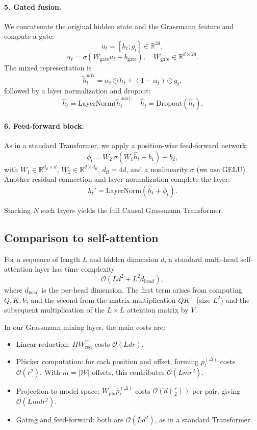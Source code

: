 \documentclass[11pt]{article}
\begin{document}
\paragraph{5. Gated fusion.}
We concatenate the original hidden state and the Grassmann feature and compute a gate:
\[
u_t = [h_t; g_t] \in \mathbb{R}^{2d},
\]
\[
\alpha_t = \sigma(W_{\text{gate}} u_t + b_{\text{gate}}),\quad W_{\text{gate}} \in \mathbb{R}^{d \times 2d}.
\]
The mixed representation is
\[
\tilde{h}_t^{\text{mix}} = \alpha_t \odot h_t + (1 - \alpha_t) \odot g_t,
\]
followed by a layer normalization and dropout:
\[
\hat{h}_t = \text{LayerNorm}(\tilde{h}_t^{\text{mix});}\quad \hat{h}_t = \text{Dropout}(\hat{h}_t).
\]

\paragraph{6. Feed-forward block.}
As in a standard Transformer, we apply a position-wise feed-forward network:
\[
\phi_t = W_2 \,\sigma(W_1 \hat{h}_t + b_1) + b_2,
\]
with $W_1 \in \mathbb{R}^{d_{\text{ff}} \times d}$, $W_2 \in \mathbb{R}^{d \times d_{\text{ff}}}$, $d_{\text{ff}} = 4d$, and a nonlinearity $\sigma$ (we use GELU). Another residual connection and layer normalization complete the layer:
\[
h_t' = \text{LayerNorm}(\hat{h}_t + \phi_t).
\]

Stacking $N$ such layers yields the full Causal Grassmann Transformer.

\subsection{Comparison to self-attention}

For a sequence of length $L$ and hidden dimension $d$, a standard multi-head self-attention layer has time complexity
\[
\mathcal{O}(L d^2 + L^2 d_{\text{head}}),
\]
where $d_{\text{head}}$ is the per-head dimension. The first term arises from computing $Q,K,V$, and the second from the matrix multiplication $QK^\top$ (size $L^2$) and the subsequent multiplication of the $L \times L$ attention matrix by $V$.

In our Grassmann mixing layer, the main costs are:

\begin{itemize}
    \item Linear reduction: $H W_{\text{red}}^\top$ costs $\mathcal{O}(L d r)$.
    \item Pl\"ucker computation: for each position and offset, forming $p_t^{(\Delta)}$ costs $\mathcal{O}(r^2)$. With $m = |\mathcal{W}|$ offsets, this contributes $\mathcal{O}(L m r^2)$.
    \item Projection to model space: $W_{\text{pl\"u}} \hat{p}_t^{(\Delta)}$ costs $\mathcal{O}(d \binom{r}{2})$ per pair, giving $\mathcal{O}(L m d r^2)$.
    \item Gating and feed-forward: both are $\mathcal{O}(L d^2)$, as in a standard Transformer.
\end{itemize}
\end{document}
